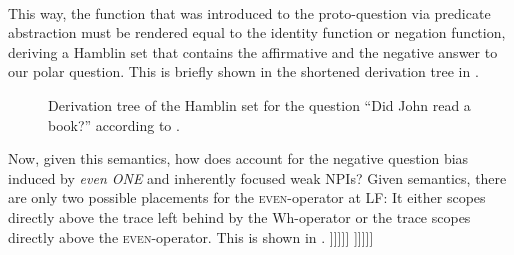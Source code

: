 \ex{}
{}\\\emptyfill\parencite[p.~331]{Guerzoni2004}
\xe
This way, the function that was introduced to the proto-question via predicate abstraction must be rendered equal to the identity function or negation function, deriving a Hamblin set that contains the affirmative and the negative answer to our polar question. This is briefly shown in the shortened derivation tree in .
\begin{figure}[!htb]
    \centering
    
    \caption{Derivation tree of the Hamblin set for the question \enquote{Did John read a book?} according to \textcite{Guerzoni2003,Guerzoni2004}.}
\end{figure}
Now, given this semantics, how does \textcite{Guerzoni2003,Guerzoni2004} account for the negative question bias induced by \textit{even \MakeUppercase{one}} and inherently focused weak NPIs? Given  semantics, there are only two possible placements for the {\scshape even}-operator at LF: It either scopes directly above the trace left behind by the Wh-operator or the trace scopes directly above the {\scshape even}-operator. This is shown in .
\pex[nopreamble=true]\label{ex:guerzoni-even-lf}%
\a[]\phantomsection [ whether-(or-not) [ 1 [ Q [ t\textsubscript{1} [ even\textsubscript{C} [ John read a book ]\hspace{0.5mm}]\hspace{0.5mm}]\hspace{0.5mm}]\hspace{0.5mm}]\hspace{0.5mm}]
\a[]\phantomsection [ whether-(or-not) [ 1 [ Q [ even\textsubscript{C} [ t\textsubscript{1} [ John read a book ]\hspace{0.5mm}]\hspace{0.5mm}]\hspace{0.5mm}]\hspace{0.5mm}]\hspace{0.5mm}]
\xe
